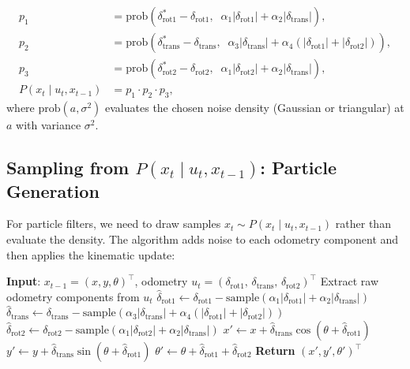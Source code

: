 \documentclass[11pt,a4paper]{article}
\theoremstyle{definition}
\theoremstyle{plain}
\theoremstyle{remark}
\begin{document}
\begin{tcolorbox}[colback=blue!5!white,colframe=blue!75!black,title=\textbf{Odometry Model: Density Evaluation}]
\begin{align*}
    p_1 &= \mathrm{prob}\!\left(\delta_{\mathrm{rot1}}^* - \delta_{\mathrm{rot1}},\;\; \alpha_1|\delta_{\mathrm{rot1}}| + \alpha_2|\delta_{\mathrm{trans}}|\right), \\
    p_2 &= \mathrm{prob}\!\left(\delta_{\mathrm{trans}}^* - \delta_{\mathrm{trans}},\;\; \alpha_3|\delta_{\mathrm{trans}}| + \alpha_4(|\delta_{\mathrm{rot1}}| + |\delta_{\mathrm{rot2}}|)\right), \\
    p_3 &= \mathrm{prob}\!\left(\delta_{\mathrm{rot2}}^* - \delta_{\mathrm{rot2}},\;\; \alpha_1|\delta_{\mathrm{rot2}}| + \alpha_2|\delta_{\mathrm{trans}}|\right), \\
    P(x_t \mid u_t, x_{t-1}) &= p_1 \cdot p_2 \cdot p_3,
\end{align*}
where $\mathrm{prob}(a, \sigma^2)$ evaluates the chosen noise density (Gaussian or triangular) at $a$ with variance $\sigma^2$.
\end{tcolorbox}

\subsection{Sampling from $P(x_t \mid u_t, x_{t-1})$: Particle Generation}

For particle filters, we need to draw samples $x_t \sim P(x_t \mid u_t, x_{t-1})$ rather than evaluate the density. The algorithm adds noise to each odometry component and then applies the kinematic update:

\begin{algorithm}
\caption{Sample Odometry Motion Model}
\begin{algorithmic}
\STATE \textbf{Input}: $x_{t-1} = (x, y, \theta)^\top$, odometry $u_t = (\delta_{\mathrm{rot1}},\, \delta_{\mathrm{trans}},\, \delta_{\mathrm{rot2}})^\top$ %
\STATE Extract raw odometry components from $u_t$
\STATE $\hat{\delta}_{\mathrm{rot1}}  \leftarrow \delta_{\mathrm{rot1}}  - \mathrm{sample}\!\left(\alpha_1|\delta_{\mathrm{rot1}}| + \alpha_2|\delta_{\mathrm{trans}}|\right)$
\STATE $\hat{\delta}_{\mathrm{trans}} \leftarrow \delta_{\mathrm{trans}} - \mathrm{sample}\!\left(\alpha_3|\delta_{\mathrm{trans}}| + \alpha_4(|\delta_{\mathrm{rot1}}| + |\delta_{\mathrm{rot2}}|)\right)$
\STATE $\hat{\delta}_{\mathrm{rot2}}  \leftarrow \delta_{\mathrm{rot2}}  - \mathrm{sample}\!\left(\alpha_1|\delta_{\mathrm{rot2}}| + \alpha_2|\delta_{\mathrm{trans}}|\right)$
\STATE $x'      \leftarrow x + \hat{\delta}_{\mathrm{trans}}\cos(\theta + \hat{\delta}_{\mathrm{rot1}})$
\STATE $y'      \leftarrow y + \hat{\delta}_{\mathrm{trans}}\sin(\theta + \hat{\delta}_{\mathrm{rot1}})$
\STATE $\theta' \leftarrow \theta + \hat{\delta}_{\mathrm{rot1}} + \hat{\delta}_{\mathrm{rot2}}$
\STATE \textbf{Return} $(x', y', \theta')^\top$ %
\end{algorithmic}
\end{algorithm}
\end{document}
